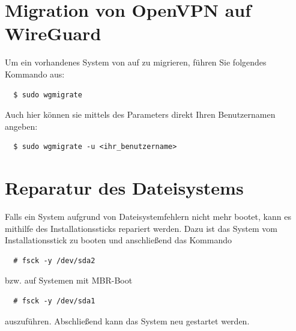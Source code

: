 \documentclass[a4paper,11pt,authoryear]{article}
\begin{document}
\section{Migration von OpenVPN auf WireGuard}
Um ein vorhandenes System von  auf  zu migrieren, führen Sie folgendes Kommando aus:
\begin{verbatim}
  $ sudo wgmigrate
\end{verbatim}
Auch hier können sie mittels des Parameters  direkt Ihren Benutzernamen angeben:
\begin{verbatim}
  $ sudo wgmigrate -u <ihr_benutzername>
\end{verbatim}

\section{Reparatur des Dateisystems}
Falls ein System aufgrund von Dateisystemfehlern nicht mehr bootet, kann es mithilfe des Installationssticks repariert werden.
Dazu ist das System vom Installationsstick zu booten und anschließend das Kommando
\begin{verbatim}
  # fsck -y /dev/sda2
\end{verbatim}
bzw. auf Systemen mit MBR-Boot
\begin{verbatim}
  # fsck -y /dev/sda1
\end{verbatim}
auszuführen.
Abschließend kann das System neu gestartet werden.

{}

\end{document}
